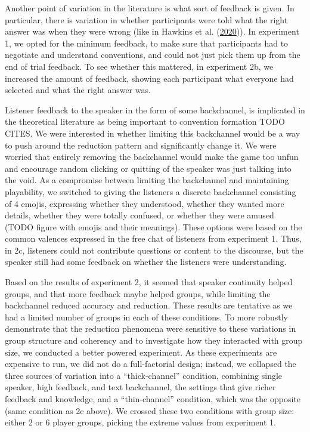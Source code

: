 \documentclass[
  english,
  a4paper,
]{article}
\begin{document}
Another point of variation in the literature is what sort of feedback is given. In particular, there is variation in whether participants were told what the right answer was when they were wrong (like in Hawkins et al. (\protect\hyperlink{ref-hawkinsCharacterizingDynamicsLearning2020}{2020})). In experiment 1, we opted for the minimum feedback, to make sure that participants had to negotiate and understand conventions, and could not just pick them up from the end of trial feedback. To see whether this mattered, in experiment 2b, we increased the amount of feedback, showing each participant what everyone had selected and what the right answer was.

Listener feedback to the speaker in the form of some backchannel, is implicated in the theoretical literature as being important to convention formation TODO CITES. We were interested in whether limiting this backchannel would be a way to push around the reduction pattern and significantly change it. We were worried that entirely removing the backchannel would make the game too unfun and encourage random clicking or quitting of the speaker was just talking into the void. As a compromise between limiting the backchannel and maintaining playability, we switched to giving the listeners a discrete backchannel consisting of 4 emojis, expressing whether they understood, whether they wanted more details, whether they were totally confused, or whether they were amused (TODO figure with emojis and their meanings). These options were based on the common valences expressed in the free chat of listeners from experiment 1. Thus, in 2c, listeners could not contribute questions or content to the discourse, but the speaker still had some feedback on whether the listeners were understanding.

Based on the results of experiment 2, it seemed that speaker continuity helped groups, and that more feedback maybe helped groups, while limiting the backchannel reduced accuracy and reduction. These results are tentative as we had a limited number of groups in each of these conditions. To more robustly demonstrate that the reduction phenomena were sensitive to these variations in group structure and coherency and to investigate how they interacted with group size, we conducted a better powered experiment. As these experiments are expensive to run, we did not do a full-factorial design; instead, we collapsed the three sources of variation into a ``thick-channel'' condition, combining single speaker, high feedback, and text backchannel, the settings that give richer feedback and knowledge, and a ``thin-channel'' condition, which was the opposite (same condition as 2c above). We crossed these two conditions with group size: either 2 or 6 player groups, picking the extreme values from experiment 1.
\end{document}

